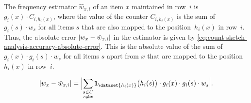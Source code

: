 The frequency estimator \( \hat{w}_{x, i} \) of an item \( x \) maintained in row~\( i \) is \( g_{i} (x) \cdot C_{i, h_{i} (x)} \), where the value of the counter \( C_{i, h_{i} (x)} \) is the sum of \( g_{i} (s) \cdot w_{s} \) for all items \( s \) that are also mapped to the position~\( h_{i} (x) \) in row~\( i \).
Thus, the absolute error \( \lvert w_{x} - \hat{w}_{x, i}\rvert \) in the estimator is given by \cref{eq:count-sketch-analysis-accuracy-absolute-error}.
This is the absolute value of the sum of \( g_{i} (x) \cdot g_{i} (s) \cdot w_{s} \) for all items \( s \) apart from \( x \) that are mapped to the position~\( h_{i} (x) \) in row~\( i \).

\begin{equation}
  \label{eq:count-sketch-analysis-accuracy-absolute-error}
  \absolute{w_{x} - \hat{w}_{x, i}} = \absolute[\Big]{\smashoperator[r]{\sum_{\substack{s \in U \\ s \neq x}}} \indicator_{\dataset{h_{i} (x)}} \bigl( h_{i} (s) \bigr) \cdot g_{i} (x) \cdot g_{i} (s) \cdot w_{s}}.
\end{equation}

